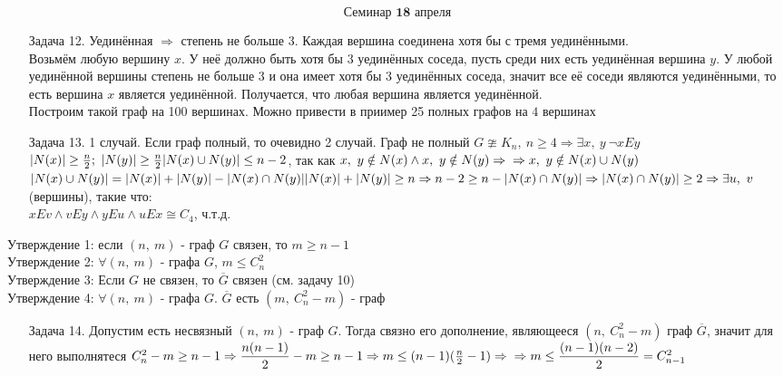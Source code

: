 \documentclass[12pt, letterpaper, twoside]{article}
\begin{document}
    \[\textbf{Семинар 18 апреля}\]
    \begin{enumerate}
        \item[Задача 12.] Уединённая $\Rightarrow$ степень не больше 3. Каждая вершина соединена хотя бы с тремя уединёнными.\\
        Возьмём любую вершину $x$. У неё должно быть хотя бы $3$ уединённых соседа, пусть среди них есть уединённая вершина $y$. У любой уединённой вершины степень не больше 3 и она имеет хотя бы 3 уединённых соседа, значит все её соседи являются уединёнными, то есть вершина $x$ является уединённой. Получается, что любая вершина является уединённой.\\
        Построим такой граф на 100 вершинах. Можно привести в приимер 25 полных графов на $4$ вершинах
        \item[Задача 13.] 1 случай. Если граф полный, то очевидно
        2 случай. Граф не полный $G \ncong K_n,\ n\geq 4\Rightarrow \exists x,\ y\ \neg xEy$\\
        $|N(x)|\geq \frac{n}{2};\ |N(y)| \geq \frac{n}{2}\\
        |N(x) \cup N(y)| \leq n - 2$, так как $x,\ y\notin N(x) \wedge x,\ y \notin N(y)\Rightarrow\\
        \Rightarrow x,\ y\notin N(x)\cup N(y)$
        $|N(x) \cup N(y)| = |N(x)| + |N(y)| - |N(x)\cap N(y)|\\
        |N(x)| + |N(y)| \geq n \Rightarrow n - 2 \geq n - |N(x) \cap N(y)|\Rightarrow |N(x) \cap N(y)| \geq 2\Rightarrow \exists u,\ v$ (вершины), такие что:\\
        $xEv \wedge vEy \wedge yEu \wedge uEx\cong C_4$, ч.т.д.
    \end{enumerate}
    Утверждение 1: если $(n,\ m)$ - граф $G$ связен, то $m \geq n - 1$\\
    Утверждение 2: $\forall (n,\ m)$ - графа $G$, $m \leq C^2_n$\\
    Утверждение 3: Если $G$ не связен, то $\overline{G}$ связен (см. задачу 10)\\
    Утверждение 4: $\forall (n,\ m)$ - графа $G$. $\overline{G}$ есть $(m,\ C_n^2 - m)$ - граф
    \begin{enumerate}
        \item[Задача 14.] Допустим есть несвязный $(n,\ m)$ - граф $G$. Тогда связно его дополнение, являющееся $(n,\ C_n^2 - m)$ граф $\overline{G}$, значит для него выполнятеся $C_n^2 - m \geq n - 1\Rightarrow \dfrac{n(n - 1)}{2} - m \geq n - 1\Rightarrow m \leq (n - 1)(\frac{n}{2} - 1)\Rightarrow\\
        \Rightarrow m \leq \dfrac{(n-  1)(n - 2)}{2} = C^2_{n - 1}$
    \end{enumerate}
\end{document}
